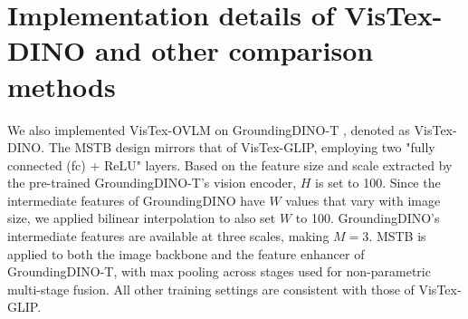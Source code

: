 \clearpage
\setcounter{page}{1}
\maketitlesupplementary



\section{Implementation details of VisTex-DINO and other comparison methods}

We also implemented VisTex-OVLM on GroundingDINO-T \cite{liu2023groundingdino}, denoted as VisTex-DINO. The MSTB design mirrors that of VisTex-GLIP, employing two "fully connected (fc) + ReLU" layers. Based on the feature size and scale extracted by the pre-trained GroundingDINO-T's vision encoder, $H$ is set to 100. Since the intermediate features of GroundingDINO have $W$ values that vary with image size, we applied bilinear interpolation to also set $W$ to 100. GroundingDINO's intermediate features are available at three scales, making $M=3$. MSTB is applied to both the image backbone and the feature enhancer of GroundingDINO-T, with max pooling across stages used for non-parametric multi-stage fusion. All other training settings are consistent with those of VisTex-GLIP.

